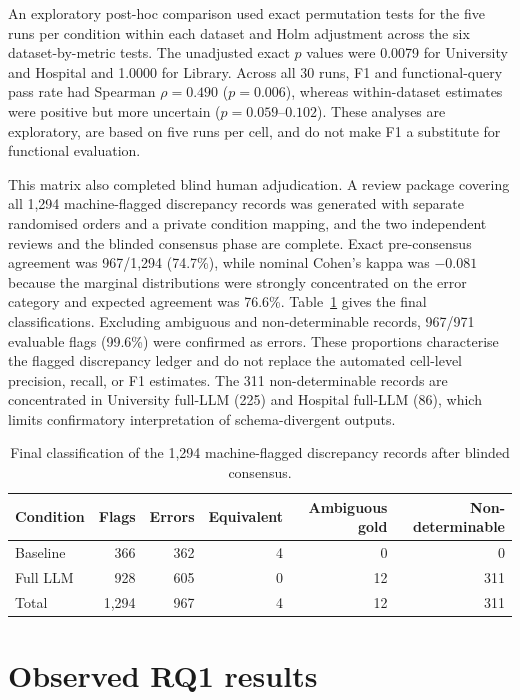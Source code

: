 \documentclass[11pt,a4paper]{article}
\begin{document}
An exploratory post-hoc comparison used exact permutation tests for the five runs per condition within each dataset and Holm adjustment across the six dataset-by-metric tests. The unadjusted exact $p$ values were 0.0079 for University and Hospital and 1.0000 for Library. Across all 30 runs, F1 and functional-query pass rate had Spearman $\rho=0.490$ ($p=0.006$), whereas within-dataset estimates were positive but more uncertain ($p=0.059$--$0.102$). These analyses are exploratory, are based on five runs per cell, and do not make F1 a substitute for functional evaluation.

This matrix also completed blind human adjudication. A review package covering all 1,294 machine-flagged discrepancy records was generated with separate randomised orders and a private condition mapping, and the two independent reviews and the blinded consensus phase are complete. Exact pre-consensus agreement was 967/1,294 (74.7\%), while nominal Cohen's kappa was $-0.081$ because the marginal distributions were strongly concentrated on the error category and expected agreement was 76.6\%. Table~\ref{tab:rq2-ledger} gives the final classifications. Excluding ambiguous and non-determinable records, 967/971 evaluable flags (99.6\%) were confirmed as errors. These proportions characterise the flagged discrepancy ledger and do not replace the automated cell-level precision, recall, or F1 estimates. The 311 non-determinable records are concentrated in University full-LLM (225) and Hospital full-LLM (86), which limits confirmatory interpretation of schema-divergent outputs.

\begin{table}[htbp]
\centering
\small
\begin{tabular}{lrrrrr}
\toprule
\textbf{Condition} & \textbf{Flags} & \textbf{Errors} & \textbf{Equivalent} & \textbf{Ambiguous gold} & \textbf{Non-determinable}\\
\midrule
Baseline & 366 & 362 & 4 & 0 & 0\\
Full LLM & 928 & 605 & 0 & 12 & 311\\
\midrule
Total & 1,294 & 967 & 4 & 12 & 311\\
\bottomrule
\end{tabular}
\caption{Final classification of the 1,294 machine-flagged discrepancy records after blinded consensus.}
\label{tab:rq2-ledger}
\end{table}

\section{Observed RQ1 results}
\label{sec:rq1-results}
\end{document}
